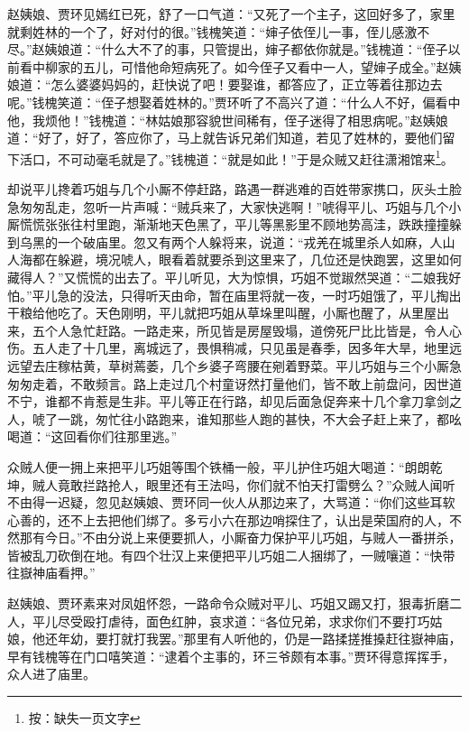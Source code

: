 \documentclass[12pt,oneside]{book}
\begin{document}
赵姨娘、贾环见嫣红已死，舒了一口气道：“又死了一个主子，这回好多了，家里就剩姓林的一个了，好对付的很。”钱槐笑道：“婶子依侄儿一事，侄儿感激不尽。”赵姨娘道：“什么大不了的事，只管提出，婶子都依你就是。”钱槐道：“侄子以前看中柳家的五儿，可惜他命短病死了。如今侄子又看中一人，望婶子成全。”赵姨娘道：“怎么婆婆妈妈的，赶快说了吧！要娶谁，都答应了，正立等着往那边去呢。”钱槐笑道：“侄子想娶着姓林的。”贾环听了不高兴了道：“什么人不好，偏看中他，我烦他！”钱槐道：“林姑娘那容貌世间稀有，侄子迷得了相思病呢。”赵姨娘道：“好了，好了，答应你了，马上就告诉兄弟们知道，若见了姓林的，要他们留下活口，不可动毫毛就是了。”钱槐道：“就是如此！”于是众贼又赶往潇湘馆来\footnote{按：缺失一页文字}。

却说平儿搀着巧姐与几个小厮不停赶路，路遇一群逃难的百姓带家携口，灰头土脸急匆匆乱走，忽听一片声喊：“贼兵来了，大家快逃啊！”唬得平儿、巧姐与几个小厮慌慌张张往村里跑，渐渐地天色黑了，平儿等黑影里不顾地势高洼，跌跌撞撞躲到乌黑的一个破庙里。忽又有两个人躲将来，说道：“戎羌在城里杀人如麻，人山人海都在躲避，境况唬人，眼看着就要杀到这里来了，几位还是快跑罢，这里如何藏得人？”又慌慌的出去了。平儿听见，大为惊惧，巧姐不觉踧然哭道：“二娘我好怕。”平儿急的没法，只得听天由命，暂在庙里将就一夜，一时巧姐饿了，平儿掏出干粮给他吃了。天色刚明，平儿就把巧姐从草垛里叫醒，小厮也醒了，从里屋出来，五个人急忙赶路。一路走来，所见皆是房屋毁塌，道傍死尸比比皆是，令人心伤。五人走了十几里，离城远了，畏惧稍减，只见虽是春季，因多年大旱，地里远远望去庄稼枯黄，草树蔫萎，几个乡婆子弯腰在剜着野菜。平儿巧姐与三个小厮急匆匆走着，不敢频言。路上走过几个村童讶然打量他们，皆不敢上前盘问，因世道不宁，谁都不肯惹是生非。平儿等正在行路，却见后面急促奔来十几个拿刀拿剑之人，唬了一跳，匆忙往小路跑来，谁知那些人跑的甚快，不大会子赶上来了，都吆喝道：“这回看你们往那里逃。”

众贼人便一拥上来把平儿巧姐等围个铁桶一般，平儿护住巧姐大喝道：“朗朗乾坤，贼人竟敢拦路抢人，眼里还有王法吗，你们就不怕天打雷劈么？”众贼人闻听不由得一迟疑，忽见赵姨娘、贾环同一伙人从那边来了，大骂道：“你们这些耳软心善的，还不上去把他们绑了。多亏小六在那边哨探住了，认出是荣国府的人，不然那有今日。”不由分说上来便要抓人，小厮奋力保护平儿巧姐，与贼人一番拼杀，皆被乱刀砍倒在地。有四个壮汉上来便把平儿巧姐二人捆绑了，一贼嚷道：“快带往嶽神庙看押。”

赵姨娘、贾环素来对凤姐怀怨，一路命令众贼对平儿、巧姐又踢又打，狠毒折磨二人，平儿尽受殴打虐待，面色红肿，哀求道：“各位兄弟，求求你们不要打巧姑娘，他还年幼，要打就打我罢。”那里有人听他的，仍是一路揉搓推搡赶往嶽神庙，早有钱槐等在门口嘻笑道：“逮着个主事的，环三爷颇有本事。”贾环得意挥挥手，众人进了庙里。
\end{document}
